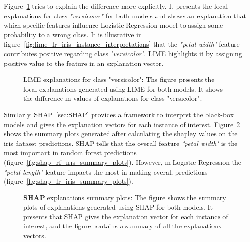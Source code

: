 \documentclass[english]{tktltiki2}
\theoremstyle{definition}
\theoremstyle{remark}
\begin{document}
Figure~\ref{fig:lime_iris_instance_interpretations} tries to explain the difference more explicitly. It presents the local explanations for class \textit{"versicolor"}
for both models and shows an explanation that which specific features influence Logistic Regression model to assign some probability to a wrong class. It is illusrative in figure~\ref{fig:lime_lr_iris_instance_interpretations} that the \textit{"petal width"} feature contributes positive regarding class \textit{"versicolor"}. LIME highlights it by assigning positive value to the feature in an explanation vector.
\begin{figure}[H]
	\vspace*{0mm}
	\centering
	\qquad
	\caption{LIME explanations for class "versicolor": The figure presents the local explanations generated using LIME for both models. It shows the difference in values of explanations for class "versicolor".}%
	\label{fig:lime_iris_instance_interpretations}%
\end{figure}


Similarly, SHAP~\ref{sec:SHAP} provides a framework to interpret the black-box models and gives the explanation vectors for each instance of interest. Figure~\ref{fig:shap_iris_summary_plots} shows the summary plots generated after calculating the shapley values on the iris dataset predictions. SHAP tells that the overall feature \textit{"petal width"} is the most important in random forest predictions (figure~\ref{fig:shap_rf_iris_summary_plots}). However, in Logistic Regression the \textit{"petal length"} feature impacts the most in making overall predictions (figure~\ref{fig:shap_lr_iris_summary_plots}). 
\begin{figure}[H]
	\vspace*{0mm}
	\centering
	\qquad
	\caption{\textbf{SHAP} explanations summary plots: The figure shows the summary plots of explanations generated using SHAP for both models. It presents that SHAP gives the explanation vector for each instance of interest, and the figure contains a summary of all the explanations vectors.}%
	\label{fig:shap_iris_summary_plots}%
\end{figure}
\end{document}
